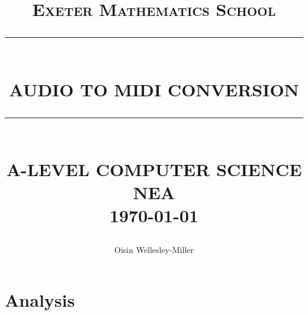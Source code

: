 \documentclass[12pt]{report}
\newcommand{\HRule}[1]{\rule{\linewidth}{#1}}
\begin{document}
\title{ \normalsize \textsc{Exeter Mathematics School}
		\\ [2.0cm]
		\HRule{0.5pt} \\
		\LARGE \textbf{\uppercase{Audio to MIDI conversion}}
		\HRule{2pt} \\ [0.5cm]
		\normalsize \uppercase{A-Level Computer Science NEA} \\
		\today \vspace*{5\baselineskip}}

\date{}

\author{
		Oisin Wellesley-Miller }

\maketitle
\tableofcontents
\newpage
\sectionfont{\scshape}


\section*{Analysis}
\end{document}
